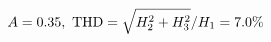 \documentclass[preview]{standalone}
\begin{document}
\begin{align*}
\special{dvisvgm:raw <g id='unique000'>}A=0.35,\ \text{THD}=\sqrt{H_2^2+H_3^2}/H_1=7.0\%\special{dvisvgm:raw </g>}
\end{align*}
\end{document}
